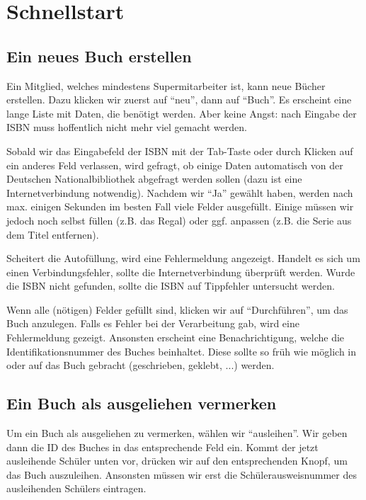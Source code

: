 




\maketitle
\newpage

\tableofcontents
\newpage

\section{Schnellstart}
\label{sec:quickstart}
\subsection{Ein neues Buch erstellen}
\label{subsec:quickstart:new_book}
Ein Mitglied, welches mindestens Supermitarbeiter ist, kann neue Bücher erstellen. Dazu klicken wir zuerst auf ``neu'', dann auf ``Buch''. Es erscheint eine lange Liste mit Daten, die benötigt werden. 
Aber keine Angst: nach Eingabe der ISBN muss hoffentlich nicht mehr viel gemacht werden.

Sobald wir das Eingabefeld der ISBN mit der Tab-Taste oder durch Klicken auf ein anderes Feld verlassen, wird gefragt,
ob einige Daten automatisch von der Deutschen Nationalbibliothek abgefragt werden sollen (dazu ist eine Internetverbindung notwendig).
Nachdem wir ``Ja'' gewählt haben, werden nach max. einigen Sekunden im besten Fall viele Felder ausgefüllt.
Einige müssen wir jedoch noch selbst füllen (z.B. das Regal) oder ggf. anpassen (z.B. die Serie aus dem Titel entfernen).

Scheitert die Autofüllung, wird eine Fehlermeldung angezeigt. Handelt es sich um einen Verbindungsfehler, sollte die Internetverbindung überprüft werden. Wurde die ISBN nicht gefunden, sollte die ISBN auf Tippfehler untersucht werden.

Wenn alle (nötigen) Felder gefüllt sind, klicken wir auf ``Durchführen'', um das Buch anzulegen.
Falls es Fehler bei der Verarbeitung gab, wird eine Fehlermeldung gezeigt. Ansonsten erscheint eine Benachrichtigung, welche die Identifikationsnummer des Buches beinhaltet.
Diese sollte so früh wie möglich in oder auf das Buch gebracht (geschrieben, geklebt, ...) werden.

\subsection{Ein Buch als ausgeliehen vermerken}
\label{subsec:quickstart:borrow}
Um ein Buch als ausgeliehen zu vermerken, wählen wir ``ausleihen''. Wir geben dann die ID des Buches in das entsprechende Feld ein. Kommt der jetzt ausleihende Schüler unten vor, drücken wir auf den entsprechenden Knopf, um das Buch auszuleihen. Ansonsten müssen wir erst die Schülerausweisnummer des ausleihenden Schülers eintragen.

